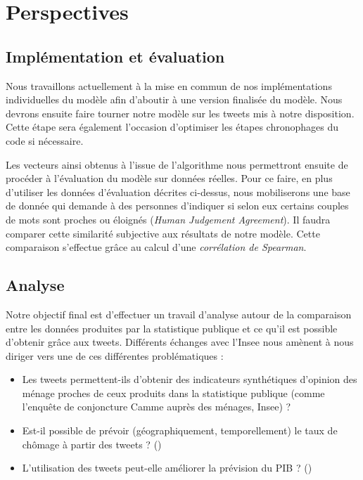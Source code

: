 \documentclass[11pt,french,french]{article}
\begin{document}
\normalsize

\hypertarget{perspectives}{%
\section{Perspectives}\label{perspectives}}

\hypertarget{impluxe9mentation-et-uxe9valuation}{%
\subsection{Implémentation et
évaluation}\label{impluxe9mentation-et-uxe9valuation}}

Nous travaillons actuellement à la mise en commun de nos implémentations
individuelles du modèle afin d'aboutir à une version finalisée du
modèle. Nous devrons ensuite faire tourner notre modèle sur les tweets
mis à notre disposition. Cette étape sera également l'occasion
d'optimiser les étapes chronophages du code si nécessaire.

Les vecteurs ainsi obtenus à l'issue de l'algorithme nous permettront
ensuite de procéder à l'évaluation du modèle sur données réelles. Pour
ce faire, en plus d'utiliser les données d'évaluation décrites
ci-dessus, nous mobiliserons une base de donnée qui demande à des
personnes d'indiquer si selon eux certains couples de mots sont proches
ou éloignés (\emph{Human Judgement Agreement}). Il faudra comparer cette
similarité subjective aux résultats de notre modèle. Cette comparaison
s'effectue grâce au calcul d'une \emph{corrélation de Spearman}.

\hypertarget{analyse}{%
\subsection{Analyse}\label{analyse}}

Notre objectif final est d'effectuer un travail d'analyse autour de la
comparaison entre les données produites par la statistique publique et
ce qu'il est possible d'obtenir grâce aux tweets. Différents échanges
avec l'Insee nous amènent à nous diriger vers une de ces différentes
problématiques :

\begin{itemize}
\item
  Les tweets permettent-ils d'obtenir des indicateurs synthétiques
  d'opinion des ménage proches de ceux produits dans la statistique
  publique (comme l'enquête de conjoncture Camme auprès des ménages,
  Insee) ?
\item
  Est-il possible de prévoir (géographiquement, temporellement) le taux
  de chômage à partir des tweets ? (\cite{Chomage})
\item
  L'utilisation des tweets peut-elle améliorer la prévision du PIB ?
  (\cite{Monde})
\end{itemize}
\end{document}
